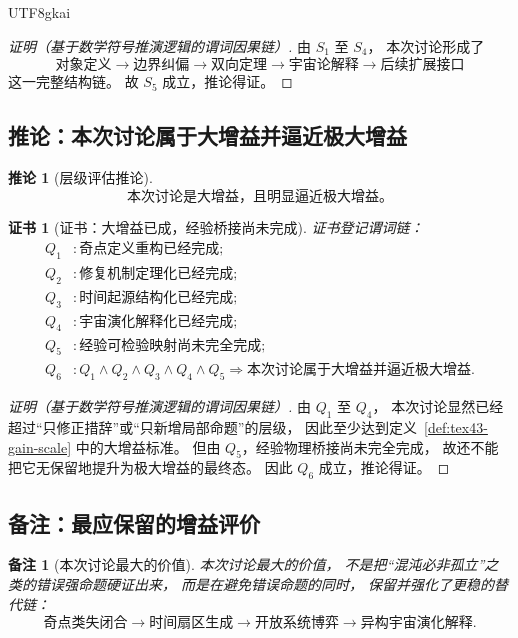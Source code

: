 \documentclass[12pt]{article}
\newtheorem{corollary}{推论}[section]
\newtheorem{remark}{备注}[section]
\newtheorem{Certificate}{证书}[section]
\begin{document}
\begin{CJK*}{UTF8}{gkai}
\begin{proof}[证明（基于数学符号推演逻辑的谓词因果链）]
由 $S_1$ 至 $S_4$，
本次讨论形成了
\[
  \text{对象定义}
  \to
  \text{边界纠偏}
  \to
  \text{双向定理}
  \to
  \text{宇宙论解释}
  \to
  \text{后续扩展接口}
\]
这一完整结构链。
故 $S_5$ 成立，推论得证。
\end{proof}

\subsection{推论：本次讨论属于大增益并逼近极大增益}
\label{subsec:tex43-ch11-corollary-scale}

\begin{corollary}[层级评估推论]
\label{cor:tex43-gain-scale}
\[
  \boxed{
    \text{本次讨论是大增益，且明显逼近极大增益。}
  }
\]
\end{corollary}

\begin{Certificate}[证书：大增益已成，经验桥接尚未完成]
\label{cert:tex43-gain-scale}
证书登记谓词链：
\[
\begin{aligned}
  Q_1 &: \text{奇点定义重构已经完成};\\
  Q_2 &: \text{修复机制定理化已经完成};\\
  Q_3 &: \text{时间起源结构化已经完成};\\
  Q_4 &: \text{宇宙演化解释化已经完成};\\
  Q_5 &: \text{经验可检验映射尚未完全完成};\\
  Q_6 &: Q_1\wedge Q_2\wedge Q_3\wedge Q_4\wedge Q_5
         \Rightarrow
         \text{本次讨论属于大增益并逼近极大增益}.
\end{aligned}
\]
\end{Certificate}

\begin{proof}[证明（基于数学符号推演逻辑的谓词因果链）]
由 $Q_1$ 至 $Q_4$，
本次讨论显然已经超过“只修正措辞”或“只新增局部命题”的层级，
因此至少达到定义~\ref{def:tex43-gain-scale} 中的大增益标准。
但由 $Q_5$，经验物理桥接尚未完全完成，
故还不能把它无保留地提升为极大增益的最终态。
因此 $Q_6$ 成立，推论得证。
\end{proof}

\subsection{备注：最应保留的增益评价}
\label{subsec:tex43-ch11-remarks}

\begin{remark}[本次讨论最大的价值]
本次讨论最大的价值，
不是把“混沌必非孤立”之类的错误强命题硬证出来，
而是在避免错误命题的同时，
保留并强化了更稳的替代链：
\[
  \text{奇点类失闭合}
  \to
  \text{时间扇区生成}
  \to
  \text{开放系统博弈}
  \to
  \text{异构宇宙演化解释}.
\]
\end{remark}


\end{CJK*}
\end{document}
